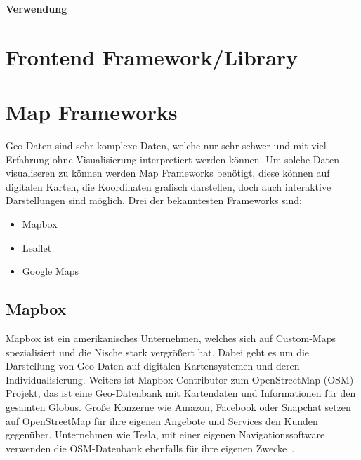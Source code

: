 \textbf{Verwendung}

\begin{center}
\end{center}

\cite{github-issue-automation}


\section{Frontend Framework/Library}
\label{sec:frontend-framework/library}



\section{Map Frameworks}
Geo-Daten sind sehr komplexe Daten, welche nur sehr schwer und mit viel Erfahrung ohne Visualisierung interpretiert werden können.
Um solche Daten visualiseren zu können werden Map Frameworks benötigt, diese können auf digitalen Karten, die Koordinaten
grafisch darstellen, doch auch interaktive Darstellungen sind möglich.
Drei der bekanntesten Frameworks sind:

\begin{itemize}
    \item Mapbox
    \item Leaflet
    \item Google Maps
\end{itemize}

\subsection{Mapbox}
Mapbox ist ein amerikanisches Unternehmen, welches sich auf Custom-Maps spezialisiert und die Nische stark vergrößert hat.
Dabei geht es um die Darstellung von Geo-Daten auf digitalen Kartensystemen und deren Individualisierung.
Weiters ist Mapbox Contributor zum OpenStreetMap (OSM) Projekt, das ist eine Geo-Datenbank mit Kartendaten und Informationen
für den gesamten Globus.
Große Konzerne wie Amazon, Facebook oder Snapchat setzen auf OpenStreetMap für ihre eigenen Angebote und Services den Kunden gegenüber.
Unternehmen wie Tesla, mit einer eigenen Navigationssoftware verwenden die OSM-Datenbank ebenfalls für ihre eigenen Zwecke~\cite{osm-customers-1, osm-customers-2}.

